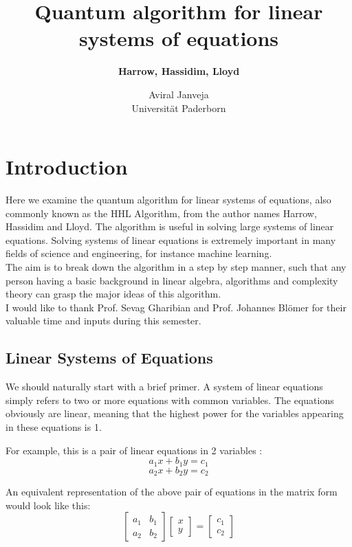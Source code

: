 \documentclass[12pt]{article}
\title{\textbf{Quantum algorithm for linear systems of equations}}
\author{\textbf{Harrow, Hassidim, Lloyd}}
\date{Aviral Janveja\\ Universit\"{a}t Paderborn}
\begin{document}
\maketitle

\section{Introduction}
Here we examine the quantum algorithm for linear systems of equations, also commonly known as the HHL Algorithm, from the author names Harrow, Hassidim and Lloyd. The algorithm is useful in solving large systems of linear equations. Solving systems of linear equations is extremely important in many fields of science and engineering, for instance machine learning.\\
The aim is to break down the algorithm in a step by step manner, such that any person having a basic background in linear algebra, algorithms and complexity theory can grasp the major ideas of this algorithm.\\
I would like to thank Prof. Sevag Gharibian and Prof. Johannes Bl\"{o}mer for their valuable time and inputs during this semester.

\subsection{Linear Systems of Equations}
We should naturally start with a brief primer. A system of linear equations simply refers to two or more equations with common variables. The equations obviously are  linear, meaning that the highest power for the variables appearing in these equations is 1.\par
For example, this is a pair of linear equations in 2 variables : 
\begin{displaymath}
a_1x + b_1y = c_1
\end{displaymath}
\begin{displaymath}
a_2x + b_2y = c_2
\end{displaymath}

An equivalent representation of the above pair of equations in the matrix form would look like this: 
\begin{displaymath}
\begin{bmatrix}
a_1 & b_1\\
a_2 & b_2
\end{bmatrix}
\begin{bmatrix}
x\\
y
\end{bmatrix} = \begin{bmatrix}
c_1\\
c_2
\end{bmatrix}
\end{displaymath}
\end{document}
